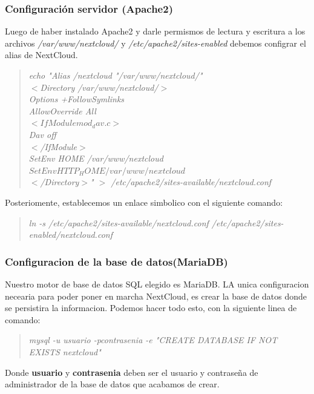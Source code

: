 \documentclass[11pt]{article}
\begin{document}
\subsubsection{Configuración servidor (Apache2)}
Luego de haber instalado Apache2 y darle permismos de lectura y escritura a los archivos  \emph{/var/www/nextcloud/} y \emph{/etc/apache2/sites-enabled} debemos configrar el alias de NextCloud.

\begin{quote}
\emph{
echo "Alias /nextcloud "/var/www/nextcloud/"}\\
\emph{$<$Directory /var/www/nextcloud/$>$}\\
\emph{Options +FollowSymlinks}\\
\emph{AllowOverride All}\\
\emph{ $<IfModule mod_dav.c>$}\\
\emph{Dav off}\\
\emph{$<$/IfModule$>$}\\
\emph{SetEnv HOME /var/www/nextcloud}\\
\emph{$SetEnv HTTP_HOME /var/www/nextcloud$}\\
\emph{$<$/Directory$>$" $>$ /etc/apache2/sites-available/nextcloud.conf}
\end{quote} 

Posteriomente, establecemos un enlace simbolico con el siguiente comando:

\begin{quote}
\emph{ 
ln -s /etc/apache2/sites-available/nextcloud.conf /etc/apache2/sites-enabled/nextcloud.conf
}
\end{quote}

\subsubsection{Configuracion de la base de datos(MariaDB)}

Nuestro motor de base de datos SQL elegido es MariaDB. LA unica configuracion necearia para poder poner en marcha NextCloud, es crear la base de datos donde se persistira la informacion. Podemos hacer todo esto, con la siguiente linea de comando:

\begin{quote}
\emph{ 
mysql -u usuario -pcontrasenia -e "CREATE DATABASE IF NOT EXISTS nextcloud" 
}
\end{quote}

Donde \textbf{usuario} y \textbf{contrasenia} deben ser el usuario y contraseña de administrador de la base de datos que acabamos de crear.
\end{document}
